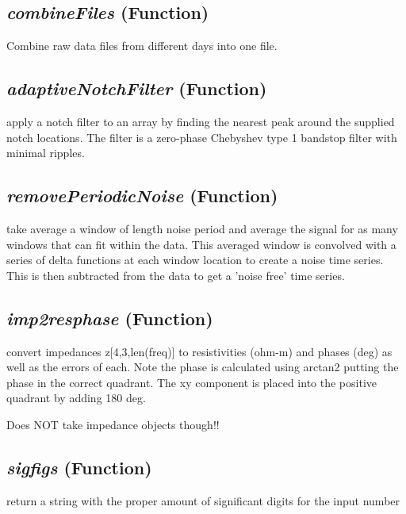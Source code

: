\subsection{\textit{combineFiles} (Function)}
\label{ssec:core.mttools.combineFiles}

Combine raw data files from different days into one file.

\subsection{\textit{adaptiveNotchFilter} (Function)}
\label{ssec:core.mttools.adaptiveNotchFilter}

apply a notch filter to an array by finding the nearest peak around
    the supplied notch locations.  The filter is a zero-phase Chebyshev type 1 
    bandstop filter with minimal ripples.

\subsection{\textit{removePeriodicNoise} (Function)}
\label{ssec:core.mttools.removePeriodicNoise}

take average a window of length noise period and 
    average the signal for as many windows that can fit within the data.  This
    averaged window is convolved with a series of delta functions at each window
    location to create a noise time series. This is then subtracted from the 
    data to get a 'noise free' time series.

\subsection{\textit{imp2resphase} (Function)}
\label{ssec:core.mttools.imp2resphase}

convert impedances z[4,3,len(freq)] to resistivities (ohm-m) and phases (deg) as well as the 
    errors of each.  Note the phase is calculated using arctan2 putting the 
    phase in the correct quadrant.  The xy component is placed into the positive
    quadrant by adding 180 deg. 

    Does NOT take impedance objects though!!

\subsection{\textit{sigfigs} (Function)}
\label{ssec:core.mttools.sigfigs}

return a string with the proper 
    amount of significant digits for the input number

